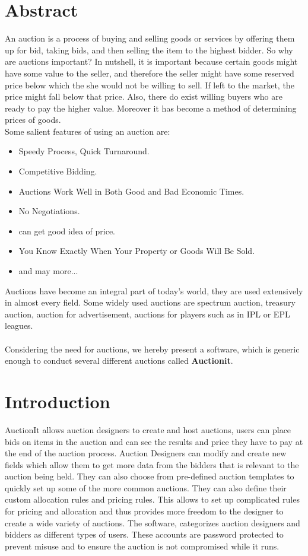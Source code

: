 \documentclass[a4paper]{article}
\begin{document}

\section*{Abstract}
An auction is a process of buying and selling goods or services by offering them up for bid, 
taking bids, and then selling the item to the highest bidder. 
So why are auctions important? In nutshell, it is important because certain goods might have some value to the seller,
and therefore the seller might have some reserved price below which the she would not be willing to sell.
If left to the market, the price might fall below that price.
Also, there do exist willing buyers who are ready to pay the higher value.
Moreover it has become a method of determining prices of goods. \\
Some salient features of using an auction are:
\begin{itemize}
	\item Speedy Process, Quick Turnaround.
	\item Competitive Bidding.
	\item Auctions Work Well in Both Good and Bad Economic Times.
	\item No Negotiations.
	\item can get good idea of price.
	\item You Know Exactly When Your Property or Goods Will Be Sold.
	\item and may more...
\end{itemize}
Auctions have become an integral part of today's world, they are used extensively in almost every field. Some widely used auctions are spectrum auction, treasury auction, auction for advertisement, auctions for players such as in IPL or EPL leagues.\\ \\
Considering the need for auctions, we hereby present a software, which is generic enough to conduct several different auctions called \textbf{Auctionit}.
\\


\pagebreak
\section*{Introduction}
AuctionIt allows auction designers to create and host auctions, users can place bids on items in the auction and can see the results and price they have to pay at the end of the auction process. Auction Designers can modify and create new fields which allow them to get more data from the bidders that is relevant to the auction being held. They can also choose from pre-defined auction templates to quickly set up some of the more common auctions. They can also define their custom allocation rules and pricing rules. This allows to set up complicated rules for pricing and allocation and thus provides more freedom to the designer to create a wide variety of auctions. 
The software, categorizes auction designers and bidders as different types of users. These accounts are password protected to prevent misuse and to ensure the auction is not compromised while it runs.
\end{document}
